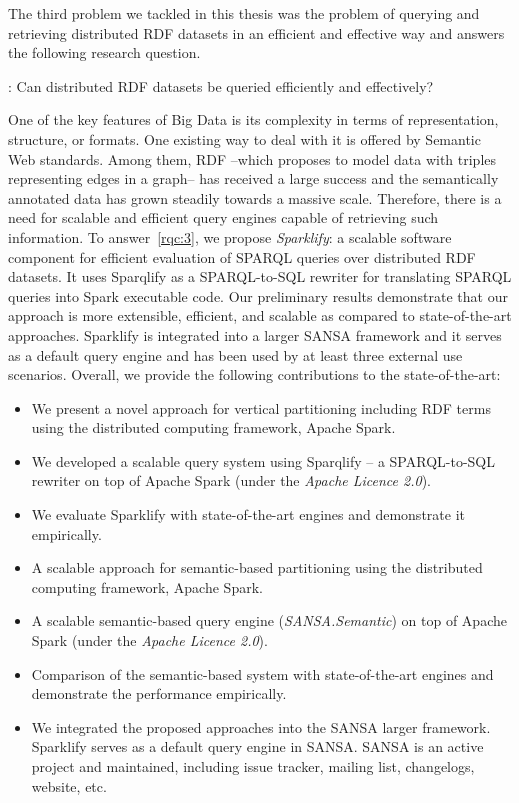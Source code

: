 The third problem we tackled in this thesis was the problem of querying and retrieving distributed \gls{RDF} datasets in an efficient and effective way and answers the following research question.

\begin{tcolorbox}
\textbf{\rqNr[RQ3]\label{rqc:3}}: Can distributed \gls{RDF} datasets be queried efficiently and effectively?
\end{tcolorbox}

One of the key features of Big Data is its complexity in terms of representation, structure, or formats.
One existing way to deal with it is offered by Semantic Web standards.
Among them, \gls{RDF} --which proposes to model data with triples representing edges in a graph-- has received a large success and the semantically annotated data has grown steadily towards a massive scale.
Therefore, there is a need for scalable and efficient query engines capable of retrieving such information.
To answer~\ref{rqc:3}, we propose \emph{Sparklify}: a scalable software component for efficient evaluation of SPARQL queries over distributed RDF datasets. 
It uses Sparqlify as a SPARQL-to-SQL rewriter for translating SPARQL queries into Spark executable code.
Our preliminary results demonstrate that our approach is more extensible, efficient, and scalable as compared to state-of-the-art approaches.
Sparklify is integrated into a larger SANSA framework and it serves as a default query engine and has been used by at least three external use scenarios.
Overall, we provide the following contributions to the state-of-the-art:

\begin{itemize}
 \item We present a novel approach for vertical partitioning including \gls{RDF} terms using the distributed computing framework, Apache Spark.
 \item We developed a scalable query system using Sparqlify -- a SPARQL-to-SQL rewriter on top of Apache Spark (under the \textit{Apache Licence 2.0}).
 \item We evaluate Sparklify with state-of-the-art engines and demonstrate it empirically.
 \item A scalable approach for semantic-based partitioning using the distributed computing framework, Apache Spark.
 \item A scalable semantic-based query engine (\textit{SANSA.Semantic}) on top of Apache Spark (under the \textit{Apache Licence 2.0}).
 \item Comparison of the semantic-based system with state-of-the-art engines and demonstrate the performance empirically.
 \item We integrated the proposed approaches into the SANSA larger framework.
 Sparklify serves as a default query engine in SANSA.
 SANSA is an active project and maintained, including issue tracker, mailing list, changelogs, website, etc.
\end{itemize}


